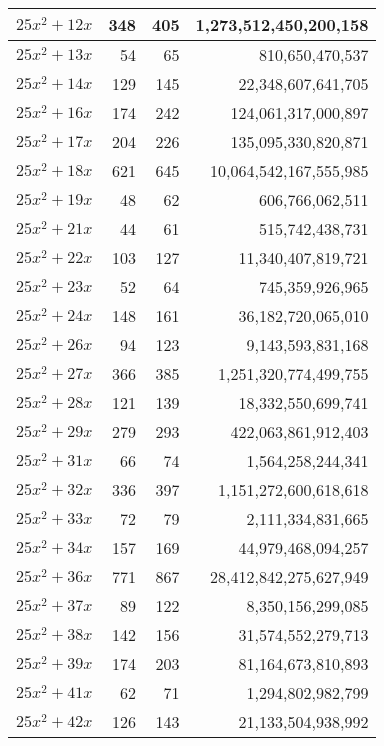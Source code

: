 \documentclass[a4paper]{amsproc}
\theoremstyle{plain}
\begin{document}
\begin{longtable}{ | l | r | r | r | }
$25x^2 + 12x$ & 348 & 405 & 1{,}273{,}512{,}450{,}200{,}158 \\ \hline
$25x^2 + 13x$ & 54 & 65 & 810{,}650{,}470{,}537 \\ \hline
$25x^2 + 14x$ & 129 & 145 & 22{,}348{,}607{,}641{,}705 \\ \hline
$25x^2 + 16x$ & 174 & 242 & 124{,}061{,}317{,}000{,}897 \\ \hline
$25x^2 + 17x$ & 204 & 226 & 135{,}095{,}330{,}820{,}871 \\ \hline
$25x^2 + 18x$ & 621 & 645 & 10{,}064{,}542{,}167{,}555{,}985 \\ \hline
$25x^2 + 19x$ & 48 & 62 & 606{,}766{,}062{,}511 \\ \hline
$25x^2 + 21x$ & 44 & 61 & 515{,}742{,}438{,}731 \\ \hline
$25x^2 + 22x$ & 103 & 127 & 11{,}340{,}407{,}819{,}721 \\ \hline
$25x^2 + 23x$ & 52 & 64 & 745{,}359{,}926{,}965 \\ \hline
$25x^2 + 24x$ & 148 & 161 & 36{,}182{,}720{,}065{,}010 \\ \hline
$25x^2 + 26x$ & 94 & 123 & 9{,}143{,}593{,}831{,}168 \\ \hline
$25x^2 + 27x$ & 366 & 385 & 1{,}251{,}320{,}774{,}499{,}755 \\ \hline
$25x^2 + 28x$ & 121 & 139 & 18{,}332{,}550{,}699{,}741 \\ \hline
$25x^2 + 29x$ & 279 & 293 & 422{,}063{,}861{,}912{,}403 \\ \hline
$25x^2 + 31x$ & 66 & 74 & 1{,}564{,}258{,}244{,}341 \\ \hline
$25x^2 + 32x$ & 336 & 397 & 1{,}151{,}272{,}600{,}618{,}618 \\ \hline
$25x^2 + 33x$ & 72 & 79 & 2{,}111{,}334{,}831{,}665 \\ \hline
$25x^2 + 34x$ & 157 & 169 & 44{,}979{,}468{,}094{,}257 \\ \hline
$25x^2 + 36x$ & 771 & 867 & 28{,}412{,}842{,}275{,}627{,}949 \\ \hline
$25x^2 + 37x$ & 89 & 122 & 8{,}350{,}156{,}299{,}085 \\ \hline
$25x^2 + 38x$ & 142 & 156 & 31{,}574{,}552{,}279{,}713 \\ \hline
$25x^2 + 39x$ & 174 & 203 & 81{,}164{,}673{,}810{,}893 \\ \hline
$25x^2 + 41x$ & 62 & 71 & 1{,}294{,}802{,}982{,}799 \\ \hline
$25x^2 + 42x$ & 126 & 143 & 21{,}133{,}504{,}938{,}992 \\ \hline

\end{longtable}
\end{document}
